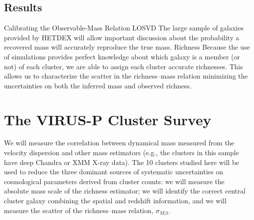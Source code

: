 \documentclass[12pt]{article}
\begin{document}
\subsection{Results}
\begin{outline}[enumerate]
	\1 Calibrating the Observable-Mass Relation
		\2 LOSVD
			\3 The large sample of galaxies provided by HETDEX will allow important discussion about the probability a recovered mass will accurately reproduce the true mass.
		\2 Richness
			\3 Because the use of simulations provides perfect knowledge about which galaxy is a member (or not) of each cluster, we are able to assign each cluster accurate richnesses. This allows us to characterize the scatter in the richness--mass relation minimizing the uncertainties on both the inferred mass and observed richness.   
\end{outline}

\section{The VIRUS-P Cluster Survey}\label{sec:vp project}
We will measure the correlation between dynamical mass measured from the velocity dispersion and other mass estimators (e.g., the clusters in this sample have deep Chandra or XMM X-ray data). The 10 clusters studied here will be used to reduce the three dominant sources of systematic uncertainties on cosmological parameters derived from cluster counts: we will measure the absolute mass scale of the richness estimator; we will identify the correct central cluster galaxy combining the spatial and redshift information, and we will measure the scatter of the richness–mass relation, $\sigma_{M|\lambda}$.
\end{document}
